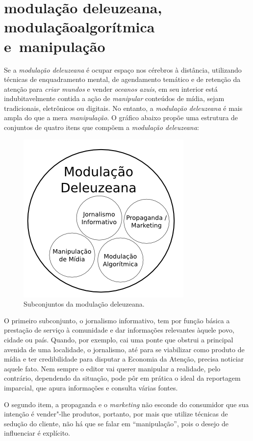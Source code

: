 \section{modulação deleuzeana, modulação\break algorítmica e~manipulação}

Se a \textit{modulação deleuzeana} é ocupar espaço nos cérebros à
distância, utilizando técnicas de enquadramento mental, de agendamento
temático e de retenção da atenção para \textit{criar mundos} e vender
\textit{oceanos azuis}, em seu interior está indubitavelmente contida a
ação de \textit{manipular} conteúdos de mídia, sejam tradicionais,
eletrônicos ou digitais. No entanto, a \textit{modulação deleuzeana} é
mais ampla do que a mera \textit{manipulação}. O gráfico abaixo propõe uma
estrutura de conjuntos de quatro itens que compõem a \textit{modulação
deleuzeana}: \enlargethispage{\baselineskip}

\begin{figure}[!ht]
\centering
\includegraphics[width=.4\textwidth]{./imgs/grafico2.png}
\caption{\formular\footnotesize{Subconjuntos da modulação deleuzeana.}}
\end{figure}

O primeiro subconjunto, o jornalismo informativo, tem por função básica
a prestação de serviço à comunidade e dar informações relevantes àquele
povo, cidade ou país. Quando, por exemplo, cai uma ponte que obstrui a
principal avenida de uma localidade, o jornalismo, até para se
viabilizar como produto de mídia e ter credibilidade para disputar a
Economia da Atenção, precisa noticiar aquele fato. Nem sempre o editor
vai querer manipular a realidade, pelo contrário, dependendo da
situação, pode pôr em prática o ideal da reportagem imparcial, que apura
informações e consulta várias fontes.

O segundo item, a propaganda e o \textit{marketing} não esconde do
consumidor que sua intenção é vender"-lhe produtos, portanto, por mais
que utilize técnicas de sedução do cliente, não há que se falar em
``manipulação'', pois o desejo de influenciar é explícito.

